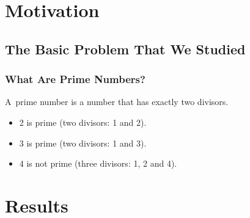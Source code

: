 \section{Motivation}
\subsection{The Basic Problem That We Studied}



\begin{frame}
  \frametitle{What Are Prime Numbers?}


  \begin{definition}

    A~\alert{prime number} is a number that has exactly two divisors.

  \end{definition}



  \begin{example}

    \begin{itemize}

    \item 2 is prime (two divisors: 1 and 2).

    \item 3 is prime (two divisors: 1 and 3).

    \item 4 is not prime (\alert{three} divisors: 1, 2 and 4).

    \end{itemize}

  \end{example}

\end{frame}





\section{Results}


